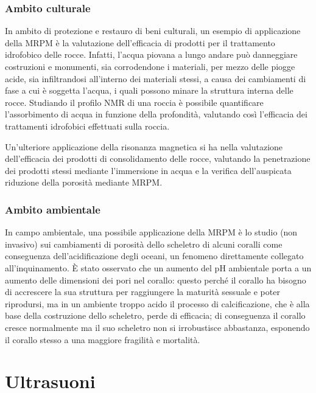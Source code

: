 \documentclass{report}
\numberwithin{equation}{section}
\numberwithin{figure}{section}
\begin{document}
\subsection{Ambito culturale}
In ambito di protezione e restauro di beni culturali, un esempio di applicazione della MRPM è la valutazione dell'efficacia di prodotti per il trattamento idrofobico delle rocce. Infatti, l'acqua piovana a lungo andare può danneggiare costruzioni e monumenti, sia corrodendone i materiali, per mezzo delle piogge acide, sia infiltrandosi all'interno dei materiali stessi, a causa dei cambiamenti di fase a cui è soggetta l'acqua, i quali possono minare la struttura interna delle rocce. Studiando il profilo NMR di una roccia è possibile quantificare l'assorbimento di acqua in funzione della profondità, valutando così l'efficacia dei trattamenti idrofobici effettuati sulla roccia.

Un'ulteriore applicazione della risonanza magnetica si ha nella valutazione dell'efficacia dei prodotti di consolidamento delle rocce, valutando la penetrazione dei prodotti stessi mediante l'immersione in acqua e la verifica dell'auspicata riduzione della porosità mediante MRPM.

\subsection{Ambito ambientale}
In campo ambientale, una possibile applicazione della MRPM è lo studio (non invasivo) sui cambiamenti di porosità dello scheletro di alcuni coralli come conseguenza dell'acidificazione degli oceani, un fenomeno direttamente collegato all'inquinamento. È stato osservato che un aumento del pH ambientale porta a un aumento delle dimensioni dei pori nel corallo: questo perché il corallo ha bisogno di accrescere la sua struttura per raggiungere la maturità sessuale e poter riprodursi, ma in un ambiente troppo acido il processo di calcificazione, che è alla base della costruzione dello scheletro, perde di efficacia; di conseguenza il corallo cresce normalmente ma il suo scheletro non si irrobustisce abbastanza, esponendo il corallo stesso a una maggiore fragilità e mortalità.

\clearpage
\null
\newpage

\chapter{Ultrasuoni}
\end{document}
